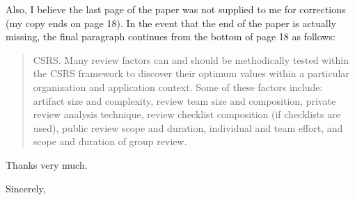 \begin {letter}
Also, I believe the last page of the paper was not supplied to me for
corrections (my copy ends on page 18).  In the event that the end of the
paper is actually missing, the final paragraph continues from the bottom
of page 18 as follows:

\begin{quotation}
\noindent CSRS.  Many review factors can and should be methodically tested
within the CSRS framework to discover their optimum values within
a particular organization and application context.  Some of these
factors include: artifact size and complexity, review team size
and composition, private review analysis technique, review checklist
composition (if checklists are used), public review scope and
duration, individual and team effort, and scope and duration of 
group review. 
\end{quotation}

Thanks very much.

\closing{Sincerely,}
\end {letter}

